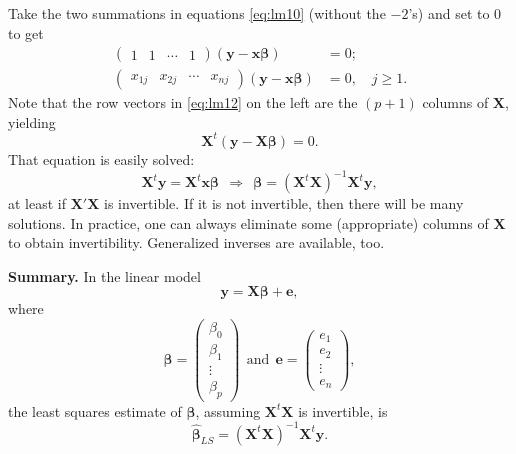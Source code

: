 \documentclass[
]{book}
\begin{document}
Take the two summations in equations \eqref{eq:lm10} (without the \(-2\)'s) and set to 0 to get
\begin{align}
\begin{pmatrix}1&1&\cdots&1\end{pmatrix}(\mathbf{y}-\mathbf{x}\boldsymbol{\beta})&=0;\\
\begin{pmatrix}x_{1j}&x_{2j}&\cdots&x_{nj}\end{pmatrix}(\mathbf{y}-\mathbf{x}\boldsymbol{\beta})&=0, \quad j\ge 1.
\label{eq:lm12}
\end{align}
Note that the row vectors in \eqref{eq:lm12} on the left are the \((p+1)\) columns of \(\mathbf{X}\), yielding
\begin{equation}
\mathbf{X}^t(\mathbf{y}-\mathbf{X}\boldsymbol{\beta}) = 0.
\label{eq:lm13}
\end{equation}
That equation is easily solved:
\begin{equation}
\mathbf{X}^t\mathbf{y} = \mathbf{X}^t\mathbf{x}\boldsymbol{\beta}~~\Rightarrow~~\boldsymbol{\beta} = (\mathbf{X}^t\mathbf{X})^{-1}\mathbf{X}^t\mathbf{y},
\label{eq:lm14}
\end{equation}
at least if \(\mathbf{X}'\mathbf{X}\) is invertible. If it is not invertible, then there will be many solutions. In practice, one can always eliminate some (appropriate) columns of \(\mathbf{X}\) to obtain invertibility. Generalized inverses are available, too.

\textbf{Summary.} In the linear model
\begin{equation}
\mathbf{y} = \mathbf{X} \boldsymbol{\beta} + \mathbf{e},
\label{eq:lm15}
\end{equation}
where
\begin{equation}
\boldsymbol{\beta} = 
\begin{pmatrix}
\beta_0\\\beta_1\\\vdots\\\beta_p
\end{pmatrix} ~~\text{and}~~
\mathbf{e} = 
\begin{pmatrix}
e_1\\e_2\\\vdots\\e_n
\end{pmatrix},
\label{eq:lm16}
\end{equation}
the least squares estimate of \(\boldsymbol{\beta}\), assuming \(\mathbf{X}^t\mathbf{X}\) is invertible, is
\begin{equation}
\widehat{\boldsymbol{\beta}}_{LS} = (\mathbf{X}^t\mathbf{X})^{-1}\mathbf{X}^t\mathbf{y}.
\label{eq:lm17}
\end{equation}
\end{document}
